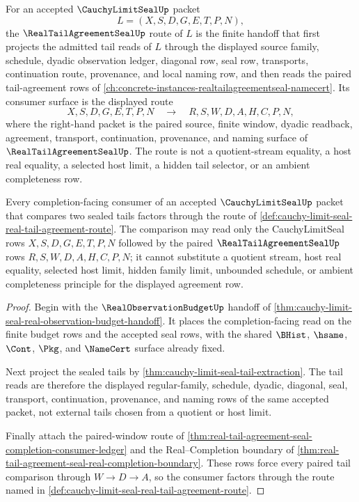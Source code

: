 \begin{definition}
\label{def:cauchy-limit-seal-real-tail-agreement-route}
For an accepted $\CauchyLimitSealUp$ packet
$$
L=(X,S,D,G,E,T,P,N),
$$
the $\RealTailAgreementSealUp$ route of $L$ is the finite handoff that first
projects the admitted tail reads of $L$ through the displayed source family,
schedule, dyadic observation ledger, diagonal row, seal row, transports,
continuation route, provenance, and local naming row, and then reads the paired
tail-agreement rows of
\autoref{ch:concrete-instances-realtailagreementseal-namecert}. Its consumer
surface is the displayed route
$$
X,S,D,G,E,T,P,N \quad\longrightarrow\quad R,S,W,D,A,H,C,P,N,
$$
where the right-hand packet is the paired source, finite window, dyadic
readback, agreement, transport, continuation, provenance, and naming surface of
$\RealTailAgreementSealUp$. The route is not a quotient-stream equality, a
host real equality, a selected host limit, a hidden tail selector, or an
ambient completeness row.
\end{definition}

\begin{theorem}
\label{thm:cauchy-limit-seal-real-tail-agreement-handoff}
Every completion-facing consumer of an accepted $\CauchyLimitSealUp$ packet
that compares two sealed tails factors through the route of
\autoref{def:cauchy-limit-seal-real-tail-agreement-route}. The comparison may
read only the CauchyLimitSeal rows $X,S,D,G,E,T,P,N$ followed by the paired
$\RealTailAgreementSealUp$ rows $R,S,W,D,A,H,C,P,N$; it cannot substitute a
quotient stream, host real equality, selected host limit, hidden family limit,
unbounded schedule, or ambient completeness principle for the displayed
agreement row.
\end{theorem}
\begin{proof}
Begin with the $\RealObservationBudgetUp$ handoff of
\autoref{thm:cauchy-limit-seal-real-observation-budget-handoff}. It places the
completion-facing read on the finite budget rows and the accepted seal rows,
with the shared $\BHist$, $\hsame$, $\Cont$, $\Pkg$, and $\NameCert$ surface
already fixed.

Next project the sealed tails by \autoref{thm:cauchy-limit-seal-tail-extraction}.
The tail reads are therefore the displayed regular-family, schedule, dyadic,
diagonal, seal, transport, continuation, provenance, and naming rows of the
same accepted packet, not external tails chosen from a quotient or host limit.

Finally attach the paired-window route of
\autoref{thm:real-tail-agreement-seal-completion-consumer-ledger} and the
Real--Completion boundary of
\autoref{thm:real-tail-agreement-seal-real-completion-boundary}. These rows
force every paired tail comparison through $W \to D \to A$, so the consumer
factors through the route named in
\autoref{def:cauchy-limit-seal-real-tail-agreement-route}.
\end{proof}

